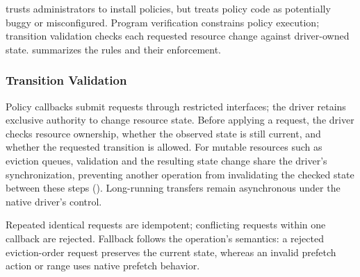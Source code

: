 \sys{} trusts administrators to install policies, but treats policy code as potentially buggy or misconfigured.
Program verification constrains policy execution; transition validation checks each requested resource change against driver-owned state.
 summarizes the rules and their enforcement.

\subsubsection{Transition Validation}

Policy callbacks submit requests through restricted interfaces; the driver retains exclusive authority to change resource state.
Before applying a request, the driver checks resource ownership, whether the observed state is still current, and whether the requested transition is allowed.
For mutable resources such as eviction queues, validation and the resulting state change share the driver's synchronization, preventing another operation from invalidating the checked state between these steps ().
Long-running transfers remain asynchronous under the native driver's control.

Repeated identical requests are idempotent; conflicting requests within one callback are rejected.
Fallback follows the operation's semantics: a rejected eviction-order request preserves the current state, whereas an invalid prefetch action or range uses native prefetch behavior.

